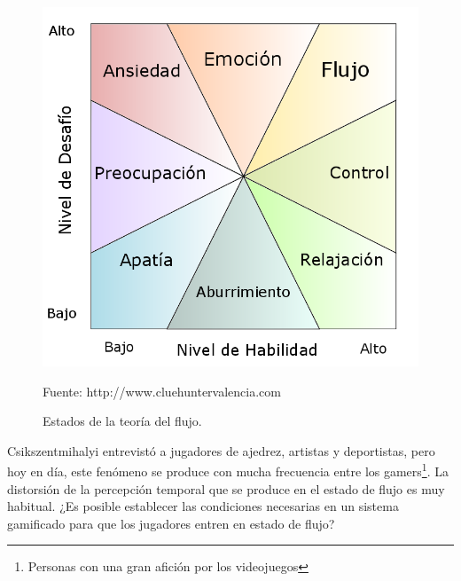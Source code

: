\begin{figure}[hbt]
\begin{center}
\caption{Estados de la teoría del flujo.}
\label{fig::Flujo}
\includegraphics[scale=0.40]{img/Flujo.png}

\small{Fuente: http://www.cluehuntervalencia.com}
\end{center}
\vspace{-0.5cm}
\end{figure}

Csikszentmihalyi entrevistó a jugadores de ajedrez, artistas y deportistas, pero hoy en día, este fenómeno se produce con mucha frecuencia entre los gamers\footnote{Personas con una gran afición por los videojuegos}.
%
La distorsión de la percepción temporal que se produce en el estado de flujo es muy habitual.
%
¿Es posible establecer las condiciones necesarias en un sistema gamificado para que los jugadores entren en estado de flujo?


